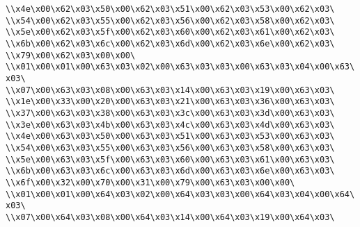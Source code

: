 \verb|\\x4e\x00\x62\x03\x50\x00\x62\x03\x51\x00\x62\x03\x53\x00\x62\x03\|\newline
\verb|\\x54\x00\x62\x03\x55\x00\x62\x03\x56\x00\x62\x03\x58\x00\x62\x03\|\newline
\verb|\\x5e\x00\x62\x03\x5f\x00\x62\x03\x60\x00\x62\x03\x61\x00\x62\x03\|\newline
\verb|\\x6b\x00\x62\x03\x6c\x00\x62\x03\x6d\x00\x62\x03\x6e\x00\x62\x03\|\newline
\verb|\\x79\x00\x62\x03\x00\x00\|\newline
\verb|\\x01\x00\x01\x00\x63\x03\x02\x00\x63\x03\x03\x00\x63\x03\x04\x00\x63\x03\|\newline
\verb|\\x07\x00\x63\x03\x08\x00\x63\x03\x14\x00\x63\x03\x19\x00\x63\x03\|\newline
\verb|\\x1e\x00\x33\x00\x20\x00\x63\x03\x21\x00\x63\x03\x36\x00\x63\x03\|\newline
\verb|\\x37\x00\x63\x03\x38\x00\x63\x03\x3c\x00\x63\x03\x3d\x00\x63\x03\|\newline
\verb|\\x3e\x00\x63\x03\x4b\x00\x63\x03\x4c\x00\x63\x03\x4d\x00\x63\x03\|\newline
\verb|\\x4e\x00\x63\x03\x50\x00\x63\x03\x51\x00\x63\x03\x53\x00\x63\x03\|\newline
\verb|\\x54\x00\x63\x03\x55\x00\x63\x03\x56\x00\x63\x03\x58\x00\x63\x03\|\newline
\verb|\\x5e\x00\x63\x03\x5f\x00\x63\x03\x60\x00\x63\x03\x61\x00\x63\x03\|\newline
\verb|\\x6b\x00\x63\x03\x6c\x00\x63\x03\x6d\x00\x63\x03\x6e\x00\x63\x03\|\newline
\verb|\\x6f\x00\x32\x00\x70\x00\x31\x00\x79\x00\x63\x03\x00\x00\|\newline
\verb|\\x01\x00\x01\x00\x64\x03\x02\x00\x64\x03\x03\x00\x64\x03\x04\x00\x64\x03\|\newline
\verb|\\x07\x00\x64\x03\x08\x00\x64\x03\x14\x00\x64\x03\x19\x00\x64\x03\|\newline
